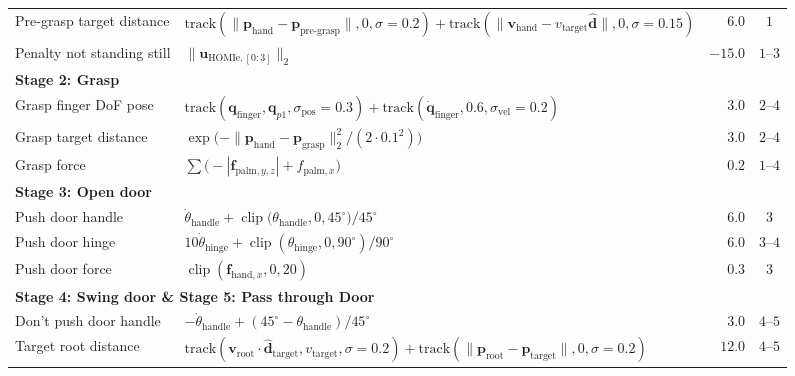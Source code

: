 \begin{table}[t]
\begin{tabular}{l l r c}
Pre-grasp target distance
  & $\text{track}(\|\mathbf{p}_{\text{hand}}-\mathbf{p}_{\text{pre-grasp}}\|, 0, \sigma=0.2) + \text{track}(\|\mathbf{v}_{\text{hand}}-v_{\text{target}}\hat{\mathbf{d}}\|, 0, \sigma=0.15)$
  & $6.0$ & $1$ \\

Penalty not standing still
  & $\|\mathbf{u}_{\text{HOMIe},[0:3]}\|_2$
  & $-15.0$ & $1$--$3$ \\

\midrule
\multicolumn{4}{l}{\textbf{Stage 2: Grasp}} \\

Grasp finger DoF pose
  & $\text{track}(\mathbf{q}_{\text{finger}}, \mathbf{q}_{p1}, \sigma_{\text{pos}}=0.3) + \text{track}(\dot{\mathbf{q}}_{\text{finger}}, 0.6, \sigma_{\text{vel}}=0.2)$
  & $3.0$ & $2$--$4$ \\

Grasp target distance
  & $\exp\bigl(-\|\mathbf{p}_{\text{hand}}-\mathbf{p}_{\text{grasp}}\|_2^{2}/(2\cdot 0.1^{2})\bigr)$
  & $3.0$ & $2$--$4$ \\

Grasp force
  & $\sum\bigl(-|\mathbf{f}_{\text{palm},y,z}| + f_{\text{palm},x}\bigr)$
  & $0.2$ & $1$--$4$ \\

\midrule
\multicolumn{4}{l}{\textbf{Stage 3: Open door}} \\

Push door handle 
  & $\dot{\theta}_{\text{handle}} + \operatorname{clip}\!\big(\theta_{\text{handle}}, 0, 45^\circ\big) / 45^\circ$ 
  & $6.0$ 
  & $3$ \\


Push door hinge
  & $10\dot{\theta}_{\text{hinge}} + \operatorname{clip}(\theta_{\text{hinge}}, 0, 90^\circ)/90^\circ$
  & $6.0$ & $3$--$4$ \\

Push door force
  & $\operatorname{clip}(\mathbf{f}_{\text{hand},x}, 0, 20)$
  & $0.3$ & $3$ \\

\midrule
\multicolumn{4}{l}{\textbf{Stage 4: Swing door \& Stage 5: Pass through Door}} \\

Don't push door handle
  & $-\dot{\theta}_{\text{handle}} + (45^\circ - \theta_{\text{handle}})/45^\circ$
  & $3.0$ & $4$--$5$ \\

Target root distance
  & $\text{track}(\mathbf{v}_{\text{root}}\cdot\hat{\mathbf{d}}_{\text{target}}, v_{\text{target}}, \sigma=0.2) + \text{track}(\|\mathbf{p}_{\text{root}}-\mathbf{p}_{\text{target}}\|, 0, \sigma=0.2)$
  & $12.0$ & $4$--$5$ \\


\end{tabular}
\end{table}
